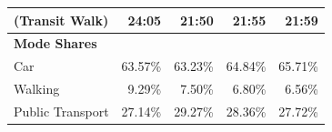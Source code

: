 \begin{table}[]
\begin{tabular}{@{}lrrrr@{}}
(Transit Walk)                     & 24:05                        & 21:50                        & 21:55                        & 21:59                        \\\midrule
\textbf{Mode Shares}               & \multicolumn{1}{l}{}         & \multicolumn{1}{l}{}         & \multicolumn{1}{l}{}         & \multicolumn{1}{l}{}         \\
Car                                & 63.57\%                      & 63.23\%                      & 64.84\%                      & 65.71\%                      \\
Walking                            & 9.29\%                       & 7.50\%                       & 6.80\%                       & 6.56\%                       \\
Public Transport                   & 27.14\%                      & 29.27\%                      & 28.36\%                      & 27.72\%                      \\ \bottomrule
\end{tabular}
\end{table}
